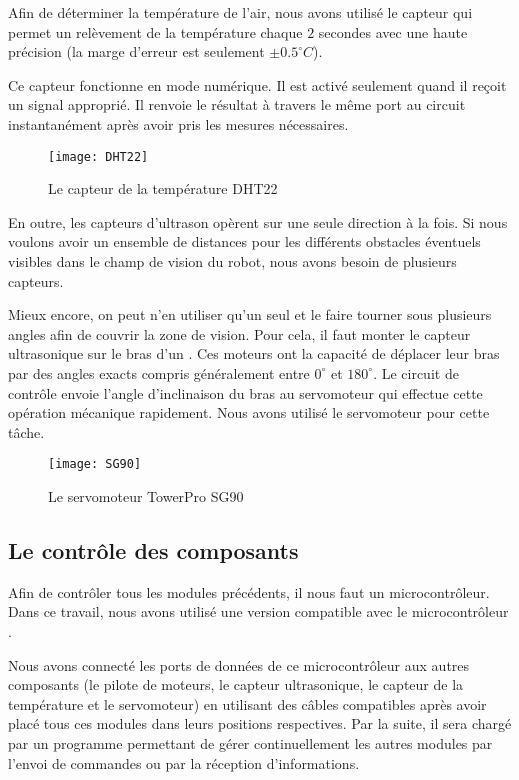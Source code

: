 Afin de déterminer la température de l'air, nous avons utilisé le capteur
 qui permet un relèvement de la température chaque $2$
secondes avec une haute précision (la marge d'erreur est seulement $\pm 0.5 ^\circ C$).

Ce capteur fonctionne en mode numérique. Il est activé seulement quand il reçoit
un signal approprié. Il renvoie le résultat à travers le même port au circuit
instantanément après avoir pris les mesures nécessaires.

\begin{figure}[h]
\begin{center}
\texttt{[image: DHT22]}
\caption{Le capteur de la température DHT22}
\end{center}
\end{figure}

En outre, les capteurs d'ultrason opèrent sur une seule direction à la fois. Si
nous voulons avoir un ensemble de distances pour les différents obstacles éventuels
visibles dans le champ de vision du robot, nous avons besoin de plusieurs capteurs.

Mieux encore, on peut n'en utiliser qu'un seul et le faire tourner sous plusieurs
angles afin de couvrir la zone de vision.
Pour cela, il faut monter le capteur ultrasonique sur le bras d'un .
Ces moteurs ont la capacité de déplacer leur bras par des angles exacts compris
généralement entre $0^\circ$ et $180^\circ$. Le circuit de contrôle envoie l'angle
d'inclinaison du bras au servomoteur qui effectue cette opération mécanique rapidement.
Nous avons utilisé le servomoteur  pour cette tâche.

\begin{figure}[h]
\begin{center}
\texttt{[image: SG90]}
\caption{Le servomoteur TowerPro SG90}
\end{center}
\end{figure}

\subsection{Le contrôle des composants}

Afin de contrôler tous les modules précédents, il nous faut un microcontrôleur.
Dans ce travail, nous avons utilisé une version compatible avec le
microcontrôleur .

Nous avons connecté les ports de données de ce microcontrôleur aux autres
composants (le pilote de moteurs, le capteur ultrasonique, le capteur de la
température et le servomoteur) en utilisant des câbles compatibles après avoir
placé tous ces modules dans leurs positions respectives. Par la suite, il sera
chargé par un programme permettant de gérer continuellement les autres modules
par l'envoi de commandes ou par la réception d'informations.

